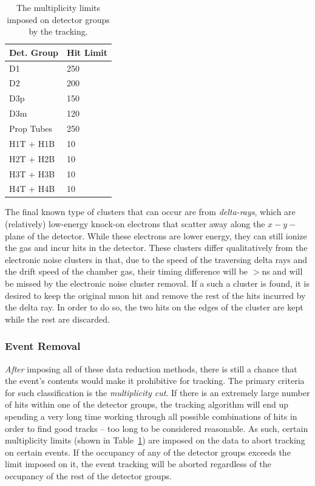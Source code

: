 \setlength{\columnsep}{28pt}
\begin{table}
	\centering
	\begin{tabular}{ll} \toprule  
		Det. Group & Hit Limit  \\ \midrule
		D1 & 250 \\  
		\rowcol D2 & 200 \\
		D3p & 150 \\
		\rowcol D3m & 120 \\
		Prop Tubes & 250 \\
		\rowcol H1T + H1B  & 10 \\
		H2T + H2B & 10 \\
		\rowcol H3T + H3B & 10 \\
		H4T + H4B & 10 \\ \bottomrule
	\end{tabular}
	\caption{The multiplicity limits imposed on detector groups by the tracking.}
	\label{tab:mult-limits}
\end{table}

The final known type of clusters that can occur are from \emph{delta-rays}, which are (relatively) low-energy knock-on electrons that scatter away along the $x-y-$plane of the detector. While these electrons are lower energy, they can still ionize the gas and incur hits in the detector. These clusters differ qualitatively from the electronic noise clusters in that, due to the speed of the traversing delta rays and the drift speed of the chamber gas, their timing difference will be $>$\unit[10]{ns} and will be missed by the electronic noise cluster removal. If a such a cluster is found, it is desired to keep the original muon hit and remove the rest of the hits incurred by the delta ray. In order to do so, the two hits on the edges of the cluster are kept while the rest are discarded.

\subsubsection{Event Removal}

\emph{After} imposing all of these data reduction methods, there is still a chance that the event's contents would make it prohibitive for tracking. The primary criteria for such classification is the \emph{multiplicity cut}. If there is an extremely large number of hits within one of the detector groups, the tracking algorithm will end up spending a very long time working through all possible combinations of hits in order to find good tracks -- too long to be considered reasonable. As such, certain multiplicity limits (shown in Table~\ref{tab:mult-limits}) are imposed on the data to abort tracking on certain events. If the occupancy of any of the detector groups exceeds the limit imposed on it, the event tracking will be aborted regardless of the occupancy of the rest of the detector groups. 

